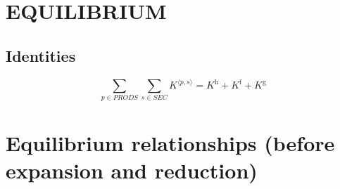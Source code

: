 \section{EQUILIBRIUM}

\subsection{Identities}

\begin{equation}
\sum_{p\in {P\!R\!O\!D\!S}} \sum_{s\in {S\!E\!C}} {K}^{\langle p,s\rangle} = K^{\mathrm{h}} + K^{\mathrm{f}} + K^{\mathrm{g}}
\end{equation}




\section{Equilibrium relationships (before expansion and reduction)}

